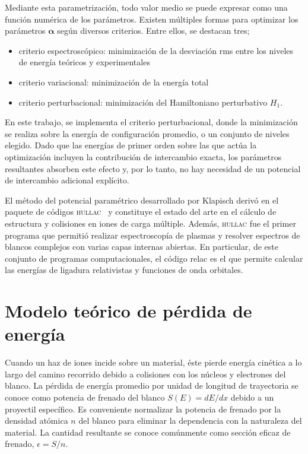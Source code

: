 Mediante esta parametrización, todo valor medio se puede expresar como 
una función numérica de los parámetros. Existen múltiples formas 
para optimizar los parámetros $\boldsymbol{\alpha}$ según diversos 
criterios. Entre ellos, se destacan tres;
\begin{itemize}
\item criterio espectroscópico: minimización de la desviación \acs{rms} 
entre los niveles de energía teóricos y experimentales
\item criterio variacional: minimización de la energía total
\item criterio perturbacional: minimización del Hamiltoniano perturbativo
$H_1$. 
\end{itemize}
En este trabajo, se implementa el criterio perturbacional, donde la 
minimización se realiza sobre la energía de configuración promedio, o 
un conjunto de niveles elegido. Dado que las energías de primer orden 
sobre las que actúa la optimización incluyen la contribución de 
intercambio exacta, los parámetros resultantes absorben este efecto y, 
por lo tanto, no hay necesidad de un potencial de intercambio adicional 
explícito.

El método del potencial paramétrico desarrollado por Klapisch derivó en
el paquete de códigos \textsc{hullac}~\cite{BarShalom:01} y constituye 
el estado del arte en el cálculo de estructura y colisiones en iones de 
carga múltiple. Además, \textsc{hullac} fue el primer programa que 
permitió realizar espectroscopía de plasmas y resolver espectros de 
blancos complejos con varias capas internas abiertas. En particular,
de este conjunto de programas computacionales, el código {\sc relac} es 
el que permite calcular las energías de ligadura relativistas y 
funciones de onda orbitales.

\section{Modelo teórico de pérdida de energía}
\label{sec:method-stopping}

Cuando un haz de iones incide sobre un material, éste pierde energía 
cinética a lo largo del camino recorrido debido a colisiones con los 
núcleos y electrones del blanco. La pérdida de energía promedio 
por unidad de longitud de trayectoria se conoce como potencia de 
frenado del blanco $S(E)=dE/dx$ debido a un proyectil específico. Es 
conveniente normalizar la potencia de frenado por la densidad atómica 
$n$ del blanco para eliminar la dependencia con la naturaleza del 
material. La cantidad resultante se conoce comúnmente como sección 
eficaz de frenado, $\epsilon=S/n$. 


